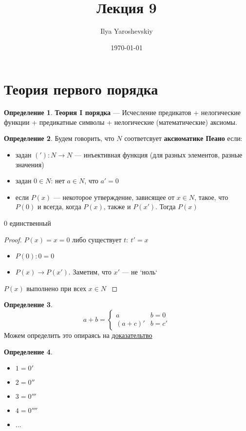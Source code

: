 \documentclass[english]{article}
\author{Ilya Yaroshevskiy}
\date{\today}
\title{Лекция 9}
\newcounter{propertycnt}
\newcommand{\beginproperty}{\setcounter{propertycnt}{1}}
\theoremstyle{plain}
\newenvironment{property}{
  \renewcommand\thepropertyinner{\arabic{propertycnt}}
  \propertyinner
}{\endpropertyinner\stepcounter{propertycnt}}
\theoremstyle{remark}
\theoremstyle{definition}
\newtheorem*{definition}{Определение}
\begin{document}
\maketitle
\tableofcontents


\section{Теория первого порядка}
\label{sec:orgd860e13}
\begin{definition}
\textbf{Теория I порядка} --- Исчесление предикатов + нелогические функции + предикатные символы + нелогические (математические) аксиомы.
\end{definition}
\begin{definition}
Будем говорить, что \(N\) соответсвует \textbf{аксиоматике Пеано} если:
\begin{itemize}
\item задан \(('): N \to N\) --- инъективная функция (для разных элементов, разные значения)
\item задан \(0 \in N\): нет \(a \in N\), что \(a' = 0\)
\item если \(P(x)\) --- некоторое утверждение, зависящее от \(x \in N\), такое, что \(P(0)\) и всегда, когда \(P(x)\), также и \(P(x')\). Тогда \(P(x)\)
\end{itemize}
\end{definition}
\beginproperty
\begin{property}
\(0\) единственный
\label{orgde224d2}
\end{property}
\begin{proof}
\(P(x)=x = 0\) либо существует \(t:\ t' = x\)
\begin{itemize}
\item \(P(0): 0 = 0\)
\item \(P(x) \to P(x')\). Заметим, что \(x'\) --- не `ноль`
\end{itemize}
\(P(x)\) выполнено при всех \(x \in N\)
\label{org4c1cc97}
\end{proof}
\begin{definition}
\[ a + b = \begin{cases}
a & b = 0 \\
(a + c)' & b = c'
\end{cases}\]
Можем определить это опираясь на \hyperref[org4c1cc97]{доказательтво}
\end{definition}
\begin{definition}
\begin{itemize}
\item \(1 = 0'\)
\item \(2 = 0''\)
\item \(3 = 0'''\)
\item \(4 = 0''''\)
\item \(\dots\)
\end{itemize}
\end{definition}
\end{document}
